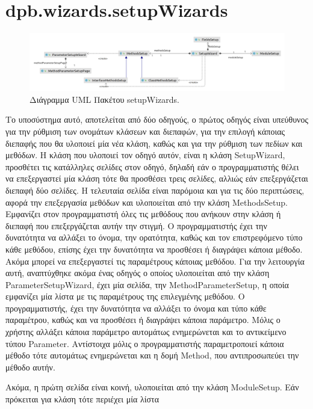 \section{dpb.wizards.setupWizards}
\label{sec:dpb.wizards.setupWizards}
\begin{figure}[H]
    \centering
    \includegraphics[width=1.0\textwidth]{Figures/setupWizard.png}
    \caption{Διάγραμμα UML Πακέτου setupWizards.}
    \label{fig:setupWizardUML}
\end{figure}
\par
Το υποσύστημα αυτό, αποτελείται από δύο οδηγούς, ο πρώτος οδηγός είναι υπεύθυνος για την ρύθμιση των ονομάτων κλάσεων και διεπαφών, 
για την επιλογή κάποιας διεπαφής που θα υλοποιεί μία νέα κλάση, καθώς και για την ρύθμιση των πεδίων και μεθόδων. 
Η κλάση που υλοποιεί τον οδηγό αυτόν, είναι η κλάση SetupWizard, προσθέτει τις κατάλληλες σελίδες στον οδηγό, δηλαδή εάν ο προγραμματιστής 
θέλει να επεξεργαστεί μία κλάση τότε θα προσθέσει τρεις σελίδες, αλλιώς εάν επεξεργάζεται διεπαφή δύο σελίδες. 
Η τελευταία σελίδα είναι παρόμοια και για τις δύο περιπτώσεις, αφορά την επεξεργασία μεθόδων και υλοποιείται από την κλάση MethodsSetup. 
Εμφανίζει στον προγραμματιστή όλες τις μεθόδους που ανήκουν στην κλάση ή διεπαφή που επεξεργάζεται αυτήν την στιγμή. 
Ο προγραμματιστής έχει την δυνατότητα να αλλάξει το όνομα, την ορατότητα, καθώς και τον επιστρεφόμενο τύπο κάθε μεθόδου, 
επίσης έχει την δυνατότητα να προσθέσει ή διαγράψει κάποια μέθοδο. Ακόμα μπορεί να επεξεργαστεί τις παραμέτρους κάποιας μεθόδου. 
Για την λειτουργία αυτή, αναπτύχθηκε ακόμα ένας οδηγός ο οποίος υλοποιείται από την κλάση ParameterSetupWizard, 
έχει μία σελίδα, την MethodParameterSetup, η οποία εμφανίζει μία λίστα με τις παραμέτρους της επιλεγμένης μεθόδου. Ο προγραμματιστής, 
έχει την δυνατότητα να αλλάξει το όνομα και τύπο κάθε παραμέτρου, καθώς και να προσθέσει ή διαγράψει κάποια παράμετρο. 
Μόλις ο χρήστης αλλάξει κάποια παράμετρο αυτομάτως ενημερώνεται και το αντικείμενο τύπου Parameter. 
Αντίστοιχα μόλις ο προγραμματιστής παραμετροποιεί κάποια μέθοδο τότε αυτομάτως ενημερώνεται και η δομή Method, 
που αντιπροσωπεύει την μέθοδο αυτήν.
\par Ακόμα, η πρώτη σελίδα είναι κοινή, υλοποιείται από την κλάση ModuleSetup. Εάν πρόκειται για κλάση τότε περιέχει μία λίστα 
